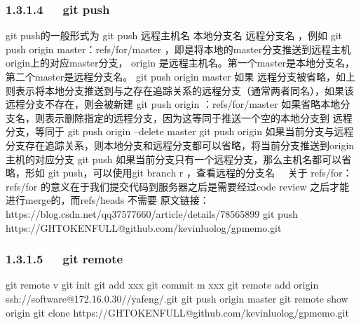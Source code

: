 \documentclass[letterpaper,12pt,english]{sphinxmanual}
\begin{document}
\subsubsection{1.3.1.4   git push}
\label{\detokenize{001software/001install/001._u7f51_u7ad9/github:git-push}}
\begin{sphinxVerbatim}[commandchars=\\\{\}]
\PYGZsh{} git push的一般形式为 git push \PYGZlt{}远程主机名\PYGZgt{} \PYGZlt{}本地分支名\PYGZgt{} \PYGZlt{}远程分支名\PYGZgt{} ，例如    git push origin master：refs/for/master    ，即是将本地的master分支推送到远程主机origin上的对应master分支， origin    是远程主机名。第一个master是本地分支名，第二个master是远程分支名。
\PYGZsh{} git push origin master
\PYGZsh{} 如果 远程分支被省略，如上则表示将本地分支推送到与之存在追踪关系的远程分支（通常两者同名），如果该远程分支不存在，则会被新建
\PYGZsh{} git push origin ：refs/for/master
\PYGZsh{} 如果省略本地分支名，则表示删除指定的远程分支，因为这等同于推送一个空的本地分支到 远程分支，等同于 git push origin –delete master
\PYGZsh{} git push origin
\PYGZsh{} 如果当前分支与远程分支存在追踪关系，则本地分支和远程分支都可以省略，将当前分支推送到origin主机的对应分支
\PYGZsh{} git push
\PYGZsh{} 如果当前分支只有一个远程分支，那么主机名都可以省略，形如 git push，可以使用git branch \PYGZhy{}r ，查看远程的分支名
\PYGZsh{}  关于 refs/for：
\PYGZsh{} refs/for 的意义在于我们提交代码到服务器之后是需要经过code review    之后才能进行merge的，而refs/heads 不需要
\PYGZsh{} 原文链接：https://blog.csdn.net/qq\PYGZus{}37577660/article/details/78565899
  \PYGZhy{} git push https://\PYGZdl{}GH\PYGZus{}TOKEN\PYGZus{}FULL@github.com/kevinluolog/gp\PYGZhy{}memo.git
\end{sphinxVerbatim}


\subsubsection{1.3.1.5   git remote}
\label{\detokenize{001software/001install/001._u7f51_u7ad9/github:git-remote}}
\begin{sphinxVerbatim}[commandchars=\\\{\}]
git remote \PYGZhy{}v
git init
git add xxx
git commit \PYGZhy{}m \PYGZsq{}xxx\PYGZsq{}
git remote add origin ssh://software@172.16.0.30/\PYGZti{}/yafeng/.git
git push origin master
git remote show origin
git clone https://\PYGZdl{}GH\PYGZus{}TOKEN\PYGZus{}FULL@github.com/kevinluolog/gp\PYGZhy{}memo.git
\end{sphinxVerbatim}
\end{document}
